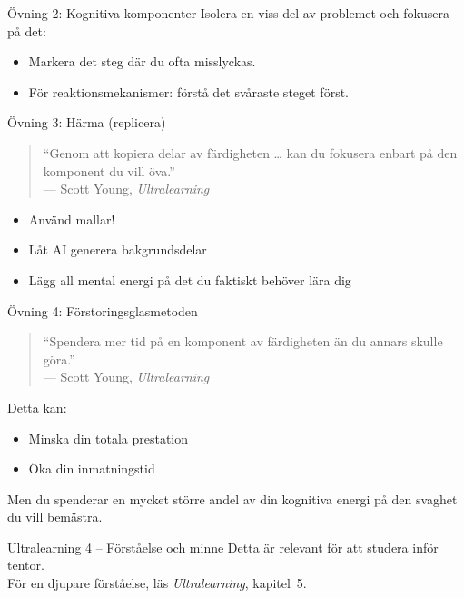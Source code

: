 \documentclass[presentation]{beamer}
\begin{document}
\begin{frame}{Övning 2: Kognitiva komponenter}
Isolera en viss del av problemet och fokusera på det:
\begin{itemize}
    \item Markera det steg där du ofta misslyckas.
  \item För reaktionsmekanismer: förstå det svåraste steget först.
\end{itemize}
\end{frame}

\begin{frame}{Övning 3: Härma (replicera)}
\begin{quote}
“Genom att kopiera delar av färdigheten … kan du fokusera enbart på den komponent du vill öva.”\\
— Scott Young, \textit{Ultralearning}
\end{quote}

\begin{itemize}
    \item Använd mallar!
    \item Låt AI generera bakgrundsdelar
    \item Lägg all mental energi på det du faktiskt behöver lära dig
\end{itemize}
\end{frame}

\begin{frame}{Övning 4: Förstoringsglasmetoden}
\begin{quote}
“Spendera mer tid på en komponent av färdigheten än du annars skulle göra.”\\
— Scott Young, \textit{Ultralearning}
\end{quote}

Detta kan:
\begin{itemize}
    \item Minska din totala prestation
    \item Öka din inmatningstid
\end{itemize}

Men du spenderar en mycket större andel av din kognitiva energi på den svaghet du vill bemästra.
\end{frame}


\begin{frame}{Ultralearning 4 – Förståelse och minne}
Detta är relevant för att studera inför tentor.\\[4pt]
För en djupare förståelse, läs \textit{Ultralearning}, kapitel~5.
\end{frame}
\end{document}

